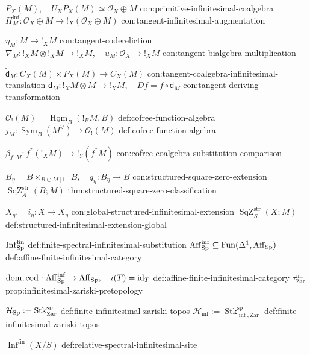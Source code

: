 \begin{longtable}
\NotationPair
{\(P_X(M),\quad U_XP_X(M)\simeq\mathcal O_X\oplus M\)}
{con:primitive-infinitesimal-coalgebra}
{\(H^{\inf}_M:\mathcal O_X\oplus M\to !_X(\mathcal O_X\oplus M)\)}
{con:tangent-infinitesimal-augmentation}

\NotationPair
{\(\eta_M:M\to !_XM\)}
{con:tangent-codereliction}
{\(\nabla_M:!_XM\otimes !_XM\to !_XM,\quad u_M:\mathcal O_X\to !_XM\)}
{con:tangent-bialgebra-multiplication}

\NotationPair
{\(\widetilde{\mathsf d}_M:C_X(M)\times P_X(M)\to C_X(M)\)}
{con:tangent-coalgebra-infinitesimal-translation}
{\(\mathsf d_M:!_XM\otimes M\to !_XM,\quad Df=f\circ\mathsf d_M\)}
{con:tangent-deriving-transformation}

\NotationPair
{\(\mathcal O_!(M)=\underline{\operatorname{Hom}}_B(!_BM,B)\)}
{def:cofree-function-algebra}
{\(j_M:\operatorname{Sym}_B(M^\vee)\to\mathcal O_!(M)\)}
{def:cofree-function-algebra}

\NotationSingle
{\(\beta_{f,M}:f^*(!_XM)\to !_Y(f^*M)\)}
{con:cofree-coalgebra-substitution-comparison}



\NotationPair
{\(B_\eta=B\times_{B\oplus M[1]}B,\quad q_\eta:B_\eta\to B\)}
{con:structured-square-zero-extension}
{\(\operatorname{SqZ}^{\mathrm{str}}_A(B;M)\)}
{thm:structured-square-zero-classification}

\NotationPair
{\(X_\eta,\quad i_\eta:X\to X_\eta\)}
{con:global-structured-infinitesimal-extension}
{\(\operatorname{SqZ}^{\mathrm{str}}_S(X;M)\)}
{def:structured-infinitesimal-extension-global}

\NotationPair
{\(\operatorname{Inf}^{\mathrm{fin}}_{\operatorname{Sp}}\)}
{def:finite-spectral-infinitesimal-substitution}
{\(\operatorname{Aff}_{\operatorname{Sp}}^{\inf}\subseteq\operatorname{Fun}(\Delta^1,\operatorname{Aff}_{\operatorname{Sp}})\)}
{def:affine-finite-infinitesimal-category}

\NotationPair
{\(\operatorname{dom},\operatorname{cod}:\operatorname{Aff}_{\operatorname{Sp}}^{\inf}\to\operatorname{Aff}_{\operatorname{Sp}},\quad i(T)=\operatorname{id}_T\)}
{def:affine-finite-infinitesimal-category}
{\(\tau^{\inf}_{\mathrm{Zar}}\)}
{prop:infinitesimal-zariski-pretopology}

\NotationPair
{\(\mathcal H_{\operatorname{Sp}}:=\operatorname{Stk}^{\mathrm{sp}}_{\mathrm{Zar}}\)}
{def:finite-infinitesimal-zariski-topos}
{\(\mathcal H_{\inf}:=\operatorname{Stk}^{\mathrm{sp}}_{\inf,\mathrm{Zar}}\)}
{def:finite-infinitesimal-zariski-topos}

\NotationSingle
{\(\operatorname{Inf}^{\mathrm{fin}}(X/S)\)}
{def:relative-spectral-infinitesimal-site}



\end{longtable}
